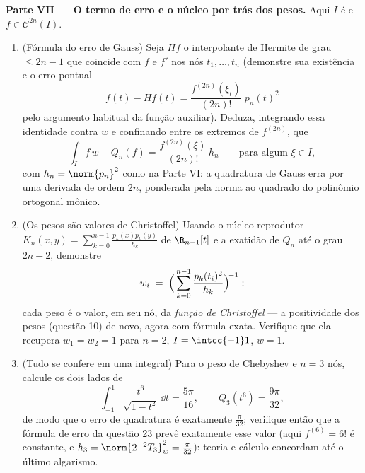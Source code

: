 \begin{problem}
\medskip
\noindent\textbf{Parte VII --- O termo de erro e o núcleo por trás dos
pesos.} Aqui $I$ é  e $f \in \mathcal
C^{2n}(I)$.
\begin{enumerate}[resume]
  \item (Fórmula do erro de Gauss) Seja $Hf$ o interpolante de
        Hermite de grau $\leq 2n - 1$ que coincide com $f$ e $f'$ nos nós
        $t_1, \dots, t_n$ (demonstre sua existência e o erro pontual
        \[
        f(t) - Hf(t) =
        \frac{f^{(2n)}(\xi_t)}{(2n)!}\;p_n(t)^2
        \]
        pelo argumento habitual da função auxiliar). Deduza,
        integrando essa identidade contra $w$ e confinando entre os
        extremos de $f^{(2n)}$, que
        \[
        \int_I f\,w - Q_n(f)
        = \frac{f^{(2n)}(\xi)}{(2n)!}\,h_n
        \qquad\text{para algum } \xi \in I,
        \]
        com $h_n = \norm{p_n}^2$ como na Parte VI: a quadratura de Gauss erra por uma
        derivada de ordem $2n$, ponderada pela norma ao quadrado do
        polinômio ortogonal mônico.
  \item (Os pesos são valores de Christoffel) Usando o núcleo
        reprodutor $K_n(x, y) = \sum_{k=0}^{n-1}
        \frac{p_k(x)p_k(y)}{h_k}$ de $\R_{n-1}[t]$ e a exatidão de $Q_n$ até o grau
        $2n - 2$, demonstre
        \[
        w_i \;=\;
        \Bigl(\,\sum_{k=0}^{n-1}
        \frac{p_k(t_i)^2}{h_k}\Bigr)^{\!-1} :
        \]
        cada peso é o valor, em seu nó, da \emph{função de
        Christoffel} --- a positividade dos pesos (questão 10) de
        novo, agora com fórmula exata. Verifique que ela recupera $w_1 = w_2 = 1$
        para $n =
        2$, $I = \intcc{-1}1$, $w = 1$.
  \item (Tudo se confere em uma integral) Para o peso de Chebyshev e
        $n = 3$ nós, calcule os dois lados de
        \[
        \int_{-1}^{1}\frac{t^6}{\sqrt{1 - t^2}}\,\dd t
        = \frac{5\pi}{16},
        \qquad
        Q_3(t^6) = \frac{9\pi}{32},
        \]
        de modo que o erro de quadratura é exatamente $\frac{\pi}{32}$; verifique
        então que a fórmula de erro da questão 23 prevê exatamente esse
        valor (aqui $f^{(6)} = 6!$ é constante, e $h_3 = \norm{2^{-2}T_3}_w^2 =
        \frac\pi{32}$): teoria e cálculo
        concordam até o último algarismo.
\end{enumerate}
\end{problem}
